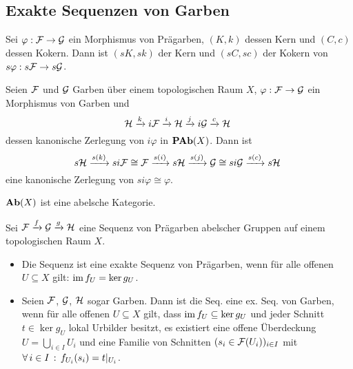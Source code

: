 \documentclass{cheat-sheet}
\begin{document}
\subsection{Exakte Sequenzen von Garben}


\begin{lem}
  Sei $\varphi : \mathcal{F} \to \mathcal{G}$ ein Morphismus von Prägarben,
  $(K, k)$ dessen Kern und $(C, c)$ dessen Kokern.
  Dann ist $(sK, sk)$ der Kern und $(sC, sc)$ der Kokern von $s \varphi : s \mathcal{F} \to s \mathcal{G}$.
\end{lem}

\begin{prop}
  Seien $\mathcal{F}$ und $\mathcal{G}$ Garben über einem topologischen Raum $X$, $\varphi : \mathcal{F} \to \mathcal{G}$ ein Morphismus von Garben und
  \[ \mathcal{H} \xrightarrow{k} i \mathcal{F} \xrightarrow{i} \mathcal{H} \xrightarrow{j} i \mathcal{G} \xrightarrow{c} \mathcal{H} \ \]
  dessen kanonische Zerlegung von $i \varphi$ in $\mathbf{PAb}(X)$. Dann ist
  \[ s \mathcal{H} \xrightarrow{s(k)} si \mathcal{F} \cong \mathcal{F} \xrightarrow{s(i)} s \mathcal{H} \xrightarrow{s(j)} \mathcal{G} \cong si \mathcal{G} \xrightarrow{s(c)} s \mathcal{H} \ \]
  eine kanonische Zerlegung von $si \varphi \cong \varphi$.
\end{prop}

\begin{kor}
  $\mathbf{Ab}(X)$ ist eine abelsche Kategorie.
\end{kor}

\begin{bem}
  Sei $\mathcal{F} \xrightarrow{f} \mathcal{G} \xrightarrow{g} \mathcal{H}$ eine Sequenz von Prägarben abelscher Gruppen auf einem topologischen Raum $X$.
  \begin{itemize}
    \item Die Sequenz ist eine exakte Sequenz von Prägarben, wenn für alle offenen $U \subseteq X$ gilt: $\operatorname{im} f_U = \ker g_U$.
    \item Seien $\mathcal{F}$, $\mathcal{G}$, $\mathcal{H}$ sogar Garben. Dann ist die Seq. eine ex. Seq. von Garben, wenn für alle offenen $U \subseteq X$ gilt, dass $\operatorname{im} f_U \subseteq \ker g_U$ und jeder Schnitt $t \in \ker g_U$ lokal Urbilder besitzt, \dh{} es existiert eine offene Überdeckung $U = {\bigcup}_{i \in I} U_i$ und eine Familie von Schnitten $(s_i \in \mathcal{F}(U_i))_{i \in I}$ mit 
    $\forall \, {i \in I} \,:\, f_{U_i}(s_i) = t|_{U_i}$.
  \end{itemize}
\end{bem}
\end{document}
